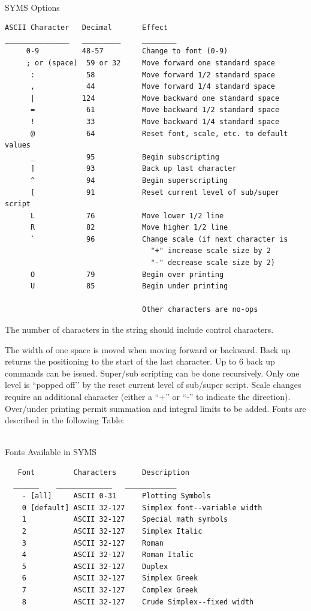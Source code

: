 \documentclass[11pt]{report}
\begin{document}
\ \\
\centerline{SYMS Options}

\begin{verbatim}
ASCII Character   Decimal       Effect
_______________   _________     ________
     0-9          48-57         Change to font (0-9)
     ; or (space)  59 or 32     Move forward one standard space
      :	           58           Move forward 1/2 standard space
      ,	           44           Move forward 1/4 standard space
      |	          124           Move backward one standard space
      =	           61           Move backward 1/2 standard space
      !	           33           Move backward 1/4 standard space
      @	           64           Reset font, scale, etc. to default values
      _	           95           Begin subscripting
      ]	           93           Back up last character
      ^	           94           Begin superscripting
      [	           91           Reset current level of sub/super script
      L	           76           Move lower 1/2 line
      R	           82           Move higher 1/2 line
      `	           96           Change scale (if next character is
                                  "+" increase scale size by 2
                                  "-" decrease scale size by 2)
      O	           79           Begin over printing
      U            85           Begin under printing

                                Other characters are no-ops
\end{verbatim}
The number of characters in the string should include control characters.

The width of one space is moved when moving forward or backward.  Back
up returns the positioning to the start of the last character.  Up to
6 back up commands can be issued.  Super/sub scripting can be done
recursively.  Only one level is ``popped off'' by the reset current
level of sub/super script.  Scale changes require an additional
character (either a ``+'' or ``-'' to indicate the direction).
Over/under printing permit summation and integral limits to be added.
Fonts are described in the following Table:\\
\ \\
\centerline{Fonts Available in SYMS}
\begin{verbatim}
   Font         Characters      Description
  ______	_____________	____________
    - [all]     ASCII 0-31      Plotting Symbols
    0 [default] ASCII 32-127	Simplex font--variable width
    1           ASCII 32-127    Special math symbols
    2           ASCII 32-127    Simplex Italic
    3           ASCII 32-127    Roman
    4           ASCII 32-127    Roman Italic
    5           ASCII 32-127    Duplex
    6           ASCII 32-127    Simplex Greek
    7           ASCII 32-127    Complex Greek
    8           ASCII 32-127    Crude Simplex--fixed width

\end{verbatim}
\end{document}
